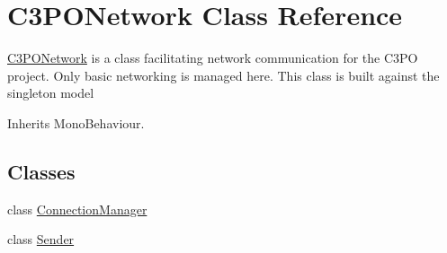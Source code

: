 \hypertarget{class_c3_p_o_network}{\section{C3\-P\-O\-Network Class Reference}
\label{class_c3_p_o_network}
}


\hyperlink{class_c3_p_o_network}{C3\-P\-O\-Network} is a class facilitating network communication for the C3\-P\-O project. Only basic networking is managed here. This class is built against the singleton model 




Inherits Mono\-Behaviour.

\subsection*{Classes}
\begin{DoxyCompactItemize}
\item 
class \hyperlink{class_c3_p_o_network_1_1_connection_manager}{Connection\-Manager}
\item 
class \hyperlink{class_c3_p_o_network_1_1_sender}{Sender}
\end{DoxyCompactItemize}
